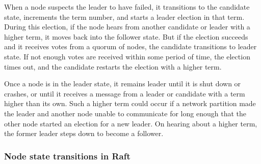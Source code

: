 When a node suspects the leader to have failed, it transitions to the candidate state, increments the term number, and starts a leader election in that term.
During this election, if the node hears from another candidate or leader with a higher term, it moves back into the follower state.
But if the election succeeds and it receives votes from a quorum of nodes, the candidate transitions to leader state.
If not enough votes are received within some period of time, the election times out, and the candidate restarts the election with a higher term.

Once a node is in the leader state, it remains leader until it is shut down or crashes, or until it receives a message from a leader or candidate with a term higher than its own.
Such a higher term could occur if a network partition made the leader and another node unable to communicate for long enough that the other node started an election for a new leader.
On hearing about a higher term, the former leader steps down to become a follower.

\begin{frame}
    \label{s:raft-states}
    \frametitle{Node state transitions in Raft}
    \begin{center}
    \end{center}%
\end{frame}
\label{l:raft-states}

